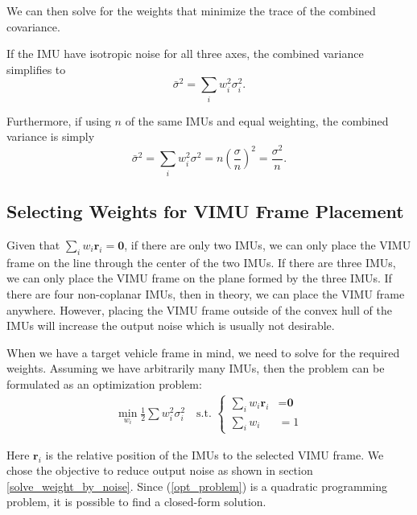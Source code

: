 \documentclass[conference]{IEEEtran}
\begin{document}
\noindent We can then solve for the weights that minimize the trace of the combined covariance.

If the IMU have isotropic noise for all three axes, the combined variance simplifies to
\begin{equation}\label{noise_reduction_asym}
    \bar{\sigma}^2 = \sum_i{w_i^2 \sigma_i^2}.
\end{equation}

\noindent Furthermore, if using $n$ of the same IMUs and equal weighting, the combined variance is simply
\begin{equation}\label{noise_reduction_sym}
    \bar{\sigma}^2 = \sum_i{w_i^2 \sigma^2} = n \left(\frac{\sigma}{n}\right)^2 = \frac{\sigma^2}{n}.
\end{equation}

\subsection{Selecting Weights for VIMU Frame Placement}

Given that $\sum_i{w_i \textbf{r}_i} = \textbf{0}$, if there are only two IMUs, we can only place the VIMU frame on the line through the center of the two IMUs. If there are three IMUs, we can only place the VIMU frame on the plane formed by the three IMUs. If there are four non-coplanar IMUs, then in theory, we can place the VIMU frame anywhere. However, placing the VIMU frame outside of the convex hull of the IMUs will increase the output noise which is usually not desirable.

When we have a target vehicle frame in mind, we need to solve for the required weights. Assuming we have arbitrarily many IMUs, then the problem can be formulated as an optimization problem:
\begin{equation}\label{opt_problem}
\begin{split}
    \min_{w_i}{\frac{1}{2} \sum{w_i^2 \sigma_i^2}} \quad \text{s.t. }
    \begin{cases}
      \sum_i{w_i \textbf{r}_i} &= \textbf{0} \\
      \sum_i{w_i} &= 1
    \end{cases}
\end{split}
\end{equation}

\noindent Here $\textbf{r}_i$ is the relative position of the IMUs to the selected VIMU frame. We chose the objective to reduce output noise as shown in section \ref{solve_weight_by_noise}. Since (\ref{opt_problem}) is a quadratic programming problem, it is possible to find a closed-form solution.
\end{document}
